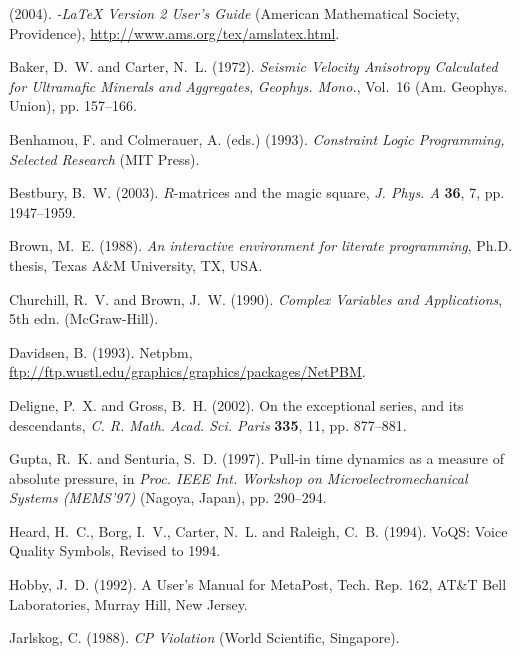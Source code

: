 \begin{thebibliography}{99}

\AmS (2004). \emph{\AmS-\LaTeX{} Version 2 User's Guide} (American Mathematical
  Society, Providence), \url{http://www.ams.org/tex/amslatex.html}.

Baker, D.~W. and Carter, N.~L. (1972). \emph{Seismic Velocity Anisotropy
  Calculated for Ultramafic Minerals and Aggregates}, \emph{Geophys.
  Mono.}, Vol.~16 (Am. Geophys. Union), pp. 157--166.

Benhamou, F. and Colmerauer, A. (eds.) (1993). \emph{Constraint Logic
  Programming, Selected Research} (MIT Press).

Bestbury, B.~W. (2003). {$R$}-matrices and the magic square, \emph{J.
  Phys. A} \textbf{36}, 7, pp. 1947--1959.

Brown, M.~E. (1988). \emph{An interactive environment for literate
  programming}, Ph.D. thesis, Texas A\&M University, TX, USA.

Churchill, R.~V. and Brown, J.~W. (1990). \emph{Complex {V}ariables and
  {A}pplications}, 5th edn. (McGraw-Hill).

Davidsen, B. (1993). Netpbm,
  \url{ftp://ftp.wustl.edu/graphics/graphics/packages/NetPBM}.

Deligne, P.~X. and Gross, B.~H. (2002). On the exceptional series, and
  its descendants, \emph{C. R. Math. Acad. Sci. Paris} \textbf{335}, 11, pp.
  877--881.

Gupta, R.~K. and Senturia, S.~D. (1997). Pull-in time dynamics as a
  measure of absolute pressure, in \emph{Proc. IEEE Int. Workshop
  on Microelectromechanical Systems (MEMS'97)} (Nagoya, Japan), pp. 290--294.

Heard, H.~C., Borg, I.~V., Carter, N.~L. and Raleigh, C.~B. (1994).
  {VoQS: Voice Quality Symbols}, Revised to 1994.

Hobby, J.~D. (1992). {A User's Manual for MetaPost}, Tech. Rep. 162,
  AT\&T Bell Laboratories, Murray Hill, New Jersey.

Jarlskog, C. (1988). \emph{CP {V}iolation} (World Scientific, Singapore).


\end{thebibliography}

